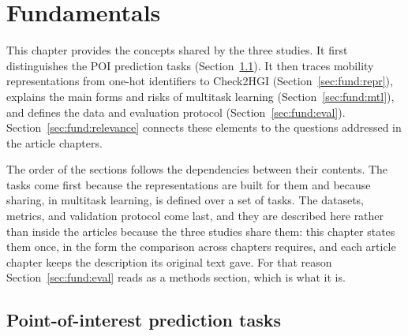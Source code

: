 

\chapter{Fundamentals}
\label{ch:fundamentals}

This chapter provides the concepts shared by the three studies. It first distinguishes
the POI prediction tasks (Section~\ref{sec:fund:tasks}). It then traces mobility
representations from one-hot identifiers to Check2HGI
(Section~\ref{sec:fund:repr}), explains the main forms and risks of multitask learning
(Section~\ref{sec:fund:mtl}), and defines the data and evaluation protocol
(Section~\ref{sec:fund:eval}). Section~\ref{sec:fund:relevance} connects these
elements to the questions addressed in the article chapters.

The order of the sections follows the dependencies between their contents. The tasks
come first because the representations are built for them and because sharing, in
multitask learning, is defined over a set of tasks. The datasets, metrics, and
validation protocol come last, and they are described here rather than inside the
articles because the three studies share them: this chapter states them once, in the
form the comparison across chapters requires, and each article chapter keeps the
description its original text gave. For that reason Section~\ref{sec:fund:eval} reads
as a methods section, which is what it is.


\section{Point-of-interest prediction tasks}
\label{sec:fund:tasks}

